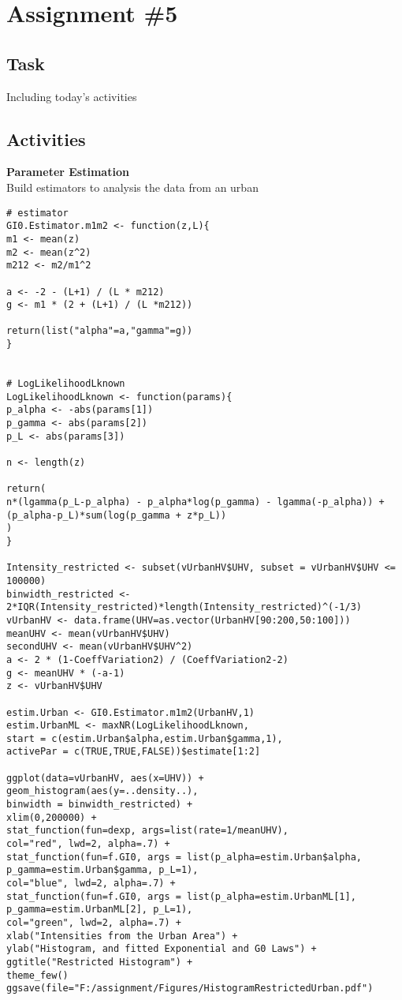 \documentclass{article}
\begin{document}
\section*{Assignment \#5}
\subsection*{Task}
Including today's activities
\subsection*{Activities}
\textbf{Parameter Estimation} \\
Build estimators to analysis the data from an urban \\
\begin{lstlisting}
# estimator
GI0.Estimator.m1m2 <- function(z,L){
m1 <- mean(z)
m2 <- mean(z^2)
m212 <- m2/m1^2

a <- -2 - (L+1) / (L * m212)
g <- m1 * (2 + (L+1) / (L *m212))

return(list("alpha"=a,"gamma"=g))
}


# LogLikelihoodLknown
LogLikelihoodLknown <- function(params){
p_alpha <- -abs(params[1])
p_gamma <- abs(params[2])
p_L <- abs(params[3])

n <- length(z)

return(
n*(lgamma(p_L-p_alpha) - p_alpha*log(p_gamma) - lgamma(-p_alpha)) + (p_alpha-p_L)*sum(log(p_gamma + z*p_L))
)
}

Intensity_restricted <- subset(vUrbanHV$UHV, subset = vUrbanHV$UHV <= 100000)
binwidth_restricted <- 2*IQR(Intensity_restricted)*length(Intensity_restricted)^(-1/3)
vUrbanHV <- data.frame(UHV=as.vector(UrbanHV[90:200,50:100]))
meanUHV <- mean(vUrbanHV$UHV)
secondUHV <- mean(vUrbanHV$UHV^2)
a <- 2 * (1-CoeffVariation2) / (CoeffVariation2-2)
g <- meanUHV * (-a-1)
z <- vUrbanHV$UHV

estim.Urban <- GI0.Estimator.m1m2(UrbanHV,1)
estim.UrbanML <- maxNR(LogLikelihoodLknown,
start = c(estim.Urban$alpha,estim.Urban$gamma,1),
activePar = c(TRUE,TRUE,FALSE))$estimate[1:2]

ggplot(data=vUrbanHV, aes(x=UHV)) + 
geom_histogram(aes(y=..density..), 
binwidth = binwidth_restricted) + 
xlim(0,200000) +
stat_function(fun=dexp, args=list(rate=1/meanUHV), 
col="red", lwd=2, alpha=.7) +
stat_function(fun=f.GI0, args = list(p_alpha=estim.Urban$alpha, p_gamma=estim.Urban$gamma, p_L=1),
col="blue", lwd=2, alpha=.7) +
stat_function(fun=f.GI0, args = list(p_alpha=estim.UrbanML[1], p_gamma=estim.UrbanML[2], p_L=1),
col="green", lwd=2, alpha=.7) +
xlab("Intensities from the Urban Area") +
ylab("Histogram, and fitted Exponential and G0 Laws") +
ggtitle("Restricted Histogram") +
theme_few()
ggsave(file="F:/assignment/Figures/HistogramRestrictedUrban.pdf")
\end{lstlisting}
\end{document}
